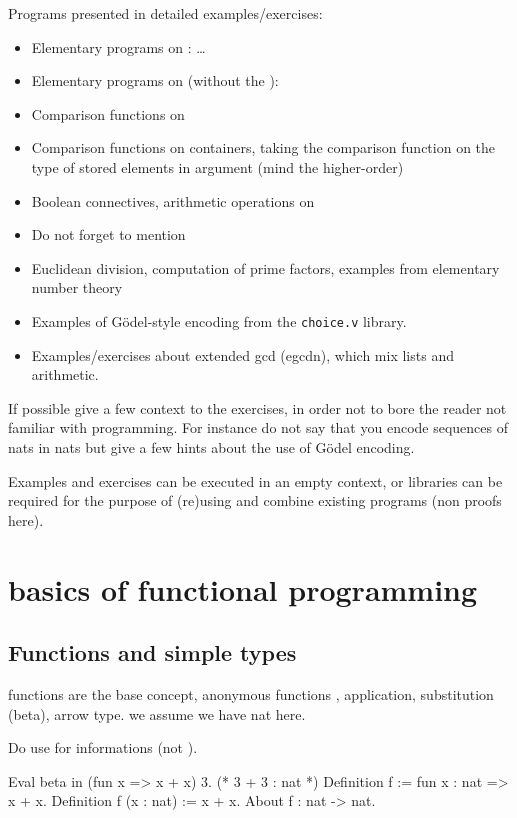 Programs presented in detailed examples/exercises:
\begin{itemize}
\item Elementary programs on : \dots
\item Elementary programs on  (without the ):
\item Comparison functions on 
\item Comparison functions on containers, taking the comparison
  function on the type of stored elements in argument (mind the
  higher-order)
\item Boolean connectives, arithmetic operations on 
\item Do not forget to mention 
\item Euclidean division, computation of prime factors, examples from
  elementary number theory
\item Examples of G{\"o}del-style encoding from the {\tt choice.v} library.
\item Examples/exercises about extended gcd (egcdn), which mix lists
  and arithmetic.
\end{itemize}
If possible give a few context to the exercises, in order not to bore
the reader not familiar with programming. For instance do not say that
you encode sequences of nats in nats but give a few hints about the
use of G{\"o}del encoding.

Examples and exercises can be executed in an empty context, or
libraries can be required for the purpose of (re)using and combine existing
programs (non proofs here).
\section{basics of functional programming}

\subsection{Functions and simple types}
functions are the base concept,
anonymous functions ,
application,
substitution (beta), arrow type.
we assume we have nat here.

Do use  for informations (not ).
\begin{coq}{}
Eval beta in (fun x => x + x) 3. (* 3 + 3 : nat *)
Definition f := fun x : nat => x + x.
Definition f (x : nat) := x + x.
About f : nat -> nat.
\end{coq}

